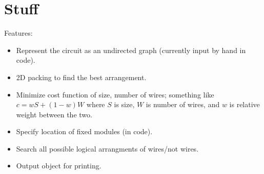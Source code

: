 \documentclass{chi-ext}
\begin{document}
	
\section{Stuff}
	Features:
	\begin{itemize}
		\item Represent the circuit as an undirected graph (currently
			input by hand in code).
		\item 2D packing to find the best arrangement.
		\item Minimize cost function of size, number of wires; something
			like $c = wS + (1-w)W$ where $S$ is size, $W$ is number of
			wires, and $w$ is relative weight between the two.
		\item Specify location of fixed modules (in code).
		\item Search all possible logical arrangments of wires/not wires.
		\item Output object for printing.
	\end{itemize}




\balance


\end{document}
